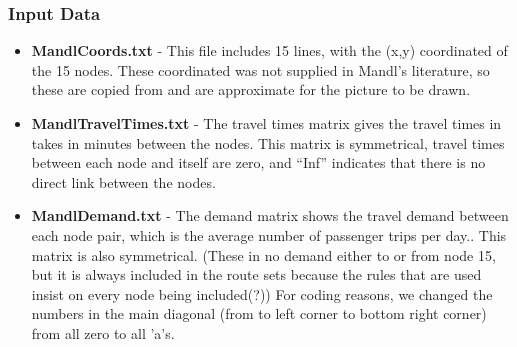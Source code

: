 \subsubsection {Input Data}
\begin{itemize}
\item \textbf{MandlCoords.txt} - This file includes 15 lines, with the (x,y) coordinated of the 15 nodes. These coordinated was not supplied in Mandl's literature, so these are copied from \citet{fan09} and are approximate for the picture to be drawn.

\begingroup
\obeyspaces\obeylines
%
\endgroup%

\item \textbf{MandlTravelTimes.txt} - The travel times matrix gives the travel times in takes in minutes between the nodes. This matrix is symmetrical, travel times between each node and itself are zero, and ``Inf'' indicates that there is no direct link between the nodes. 

\begingroup
\obeyspaces\obeylines
%
\endgroup%

\item \textbf{MandlDemand.txt} - The demand matrix shows the travel demand between each node pair, which is the average number of passenger trips per day.. This matrix is also symmetrical. (These in no demand either to or from node 15, but it is always included in the route sets because the rules that are used insist on every node being included(?)) For coding reasons, we changed the numbers in the main diagonal (from to left corner to bottom right corner) from all zero to all ’a’s. 

\begingroup
\obeyspaces\obeylines
%
\endgroup%

\end{itemize}

